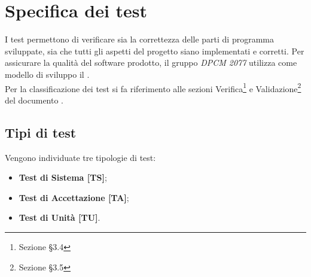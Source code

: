 
\section{Specifica dei test}
I test permettono di verificare sia la correttezza delle parti di programma sviluppate, sia che tutti gli aspetti del progetto siano implementati e corretti.
Per assicurare la qualità del software prodotto, il gruppo \textit{DPCM 2077} utilizza come modello di sviluppo il .
\\
Per la classificazione dei test si fa riferimento alle sezioni Verifica\footnote{Sezione §3.4} e Validazione\footnote{Sezione §3.5} del documento .
	\subsection{Tipi di test}
	Vengono individuate tre tipologie di test:
	\begin{itemize}
		\item \textbf{Test di Sistema [TS]};
		\item \textbf{Test di Accettazione [TA]};
		\item \textbf{Test di Unità [TU]}.
	\end{itemize}
